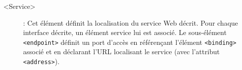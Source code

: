 \begin{description}

    \item[<Service>]: Cet élément définit la localisation du service
      Web décrit. Pour chaque interface décrite, un élément service
      lui est associé. Le sous-élément \texttt{<endpoint>} définit un
      port d’accès en référençant l’élément \texttt{<binding>} associé
      et en déclarant l'\textsc{URL} localisant le service (avec
      l’attribut \texttt{<address>}).



  \end{description}

